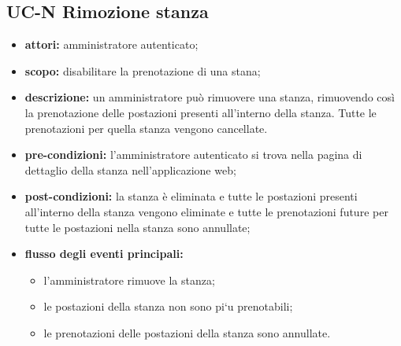 \subsection{UC-N Rimozione stanza}
\begin{itemize}
    \item \textbf{attori:} amministratore autenticato;
    \item \textbf{scopo:} disabilitare la prenotazione di una stana;
    \item \textbf{descrizione:} un amministratore pu\`{o} rimuovere una stanza, rimuovendo cos\`{i} la prenotazione delle postazioni presenti all'interno della stanza. Tutte le prenotazioni per quella stanza vengono cancellate.
    \item \textbf{pre-condizioni:} l'amministratore autenticato si trova nella pagina di dettaglio della stanza nell'applicazione web;
    \item \textbf{post-condizioni:} la stanza \`{e} eliminata e tutte le postazioni presenti all'interno della stanza vengono eliminate e tutte le prenotazioni future per tutte le postazioni nella stanza sono annullate;
    \item \textbf{flusso degli eventi principali:}
    \begin{itemize}
        \item l'amministratore rimuove la stanza;
        \item le postazioni della stanza non sono pi`{u} prenotabili;
        \item le prenotazioni delle postazioni della stanza sono annullate.
    \end{itemize}
\end{itemize}



